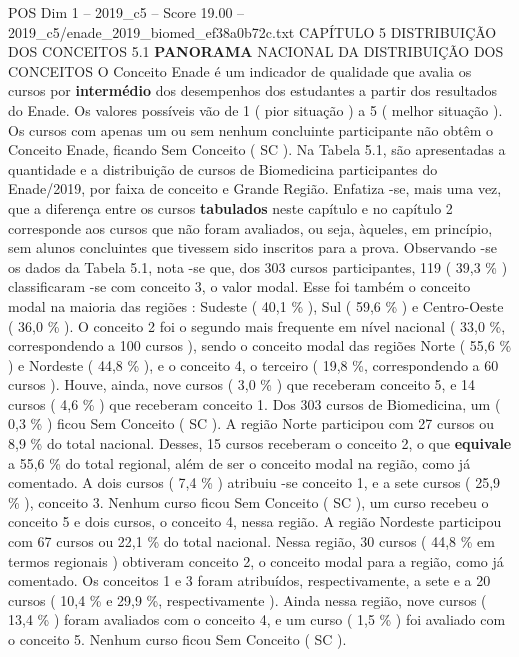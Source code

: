 \begin{textsample}{POS Dim 1 – 2019\_c5 – Score 19.00 – 2019\_c5/enade\_2019\_biomed\_ef38a0b72c.txt}  \label{ex:f1_pos_042}
CAPÍTULO 5 DISTRIBUIÇÃO DOS CONCEITOS 5.1 \textbf{PANORAMA} NACIONAL DA DISTRIBUIÇÃO DOS CONCEITOS O Conceito Enade é um indicador de qualidade que avalia os cursos por \textbf{intermédio} dos desempenhos dos estudantes a partir dos resultados do Enade.
Os valores possíveis vão de 1 ( pior situação ) a 5 ( melhor situação ).
Os cursos com apenas um ou sem nenhum concluinte participante não obtêm o Conceito Enade, ficando Sem Conceito ( SC ).
Na Tabela 5.1, são apresentadas a quantidade e a distribuição de cursos de Biomedicina participantes do Enade/2019, por faixa de conceito e Grande Região.
Enfatiza -se, mais uma vez, que a diferença entre os cursos \textbf{tabulados} neste capítulo e no capítulo 2 corresponde aos cursos que não foram avaliados, ou seja, àqueles, em princípio, sem alunos concluintes que tivessem sido inscritos para a prova.
Observando -se os dados da Tabela 5.1, nota -se que, dos 303 cursos participantes, 119 ( 39,3 \% ) classificaram -se com conceito 3, o valor modal.
Esse foi também o conceito modal na maioria das regiões : Sudeste ( 40,1 \% ), Sul ( 59,6 \% ) e Centro-Oeste ( 36,0 \% ).
O conceito 2 foi o segundo mais frequente em nível nacional ( 33,0 \%, correspondendo a 100 cursos ), sendo o conceito modal das regiões Norte ( 55,6 \% ) e Nordeste ( 44,8 \% ), e o conceito 4, o terceiro ( 19,8 \%, correspondendo a 60 cursos ).
Houve, ainda, nove cursos ( 3,0 \% ) que receberam conceito 5, e 14 cursos ( 4,6 \% ) que receberam conceito 1.
Dos 303 cursos de Biomedicina, um ( 0,3 \% ) ficou Sem Conceito ( SC ).
A região Norte participou com 27 cursos ou 8,9 \% do total nacional.
Desses, 15 cursos receberam o conceito 2, o que \textbf{equivale} a 55,6 \% do total regional, além de ser o conceito modal na região, como já comentado.
A dois cursos ( 7,4 \% ) atribuiu -se conceito 1, e a sete cursos ( 25,9 \% ), conceito 3.
Nenhum curso ficou Sem Conceito ( SC ), um curso recebeu o conceito 5 e dois cursos, o conceito 4, nessa região.
A região Nordeste participou com 67 cursos ou 22,1 \% do total nacional.
Nessa região, 30 cursos ( 44,8 \% em termos regionais ) obtiveram conceito 2, o conceito modal para a região, como já comentado.
Os conceitos 1 e 3 foram atribuídos, respectivamente, a sete e a 20 cursos ( 10,4 \% e 29,9 \%, respectivamente ).
Ainda nessa região, nove cursos ( 13,4 \% ) foram avaliados com o conceito 4, e um curso ( 1,5 \% ) foi avaliado com o conceito 5.
Nenhum curso ficou Sem Conceito ( SC ).

\end{textsample}
